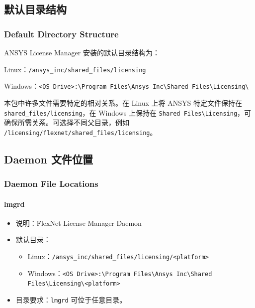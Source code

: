 \subsection{默认目录结构}
\subsubsection*{Default Directory Structure}

ANSYS License Manager 安装的默认目录结构为：

Linux：\texttt{/ansys\_inc/shared\_files/licensing}

Windows：\texttt{<OS Drive>:\textbackslash Program Files\textbackslash Ansys Inc\textbackslash Shared Files\textbackslash Licensing\textbackslash}

本包中许多文件需要特定的相对关系。在 Linux 上将 ANSYS 特定文件保持在 \texttt{shared\_files/licensing}，在 Windows 上保持在 \texttt{Shared Files\textbackslash Licensing}，可确保所需关系。可选择不同父目录，例如 \texttt{/licensing/flexnet/shared\_files/licensing}。

\subsection{Daemon 文件位置}
\subsubsection*{Daemon File Locations}

\paragraph{lmgrd}
\begin{itemize}
  \item 说明：FlexNet License Manager Daemon
  \item 默认目录：
  \begin{itemize}
    \item Linux：\texttt{/ansys\_inc/shared\_files/licensing/<platform>}
    \item Windows：\texttt{<OS Drive>:\textbackslash Program Files\textbackslash Ansys Inc\textbackslash Shared Files\textbackslash Licensing\textbackslash <platform>}
  \end{itemize}
  \item 目录要求：\texttt{lmgrd} 可位于任意目录。
\end{itemize}


